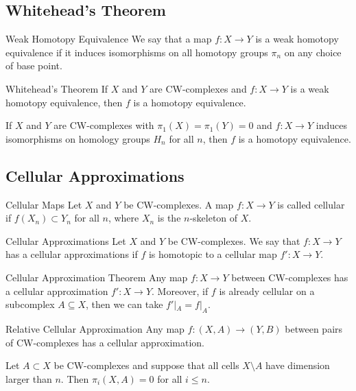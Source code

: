 \documentclass[a4paper]{article}
\begin{document}
\subsection{Whitehead's Theorem}
\begin{defn}{Weak Homotopy Equivalence}{} We say that a map $f:X\to Y$ is a weak homotopy equivalence if it induces isomorphisms on all homotopy groups $\pi_n$ on any choice of base point. 
\end{defn}

\begin{thm}{Whitehead's Theorem}{} If $X$ and $Y$ are CW-complexes and $f:X\to Y$ is a weak homotopy equivalence, then $f$ is a homotopy equivalence. 
\end{thm}

\begin{crl}{}{} If $X$ and $Y$ are CW-complexes with $\pi_1(X)=\pi_1(Y)=0$ and $f:X\to Y$ induces isomorphisms on homology groups $H_n$ for all $n$, then $f$ is a homotopy equivalence. 
\end{crl}

\subsection{Cellular Approximations}
\begin{defn}{Cellular Maps}{} Let $X$ and $Y$ be CW-complexes. A map $f:X\to Y$ is called cellular if $f(X_n)\subset Y_n$ for all $n$, where $X_n$ is the $n$-skeleton of $X$. 
\end{defn}

\begin{defn}{Cellular Approximations}{} Let $X$ and $Y$ be CW-complexes. We say that $f:X\to Y$ has a cellular approximations if $f$ is homotopic to a cellular map $f':X\to Y$. 
\end{defn}

\begin{thm}{Cellular Approximation Theorem}{} Any map $f:X\to Y$ between CW-complexes has a cellular approximation $f':X\to Y$. Moreover, if $f$ is already cellular on a subcomplex $A\subseteq X$, then we can take $f'|_A=f|_A$. 
\end{thm}

\begin{thm}{Relative Cellular Approximation}{} Any map $f:(X,A)\to (Y,B)$ between pairs of CW-complexes has a cellular approximation. 
\end{thm}

\begin{crl}{}{} Let $A\subset X$ be CW-complexes and suppose that all cells $X\setminus A$ have dimension larger than $n$. Then $\pi_i(X,A)=0$ for all $i\leq n$. 
\end{crl}
\end{document}
